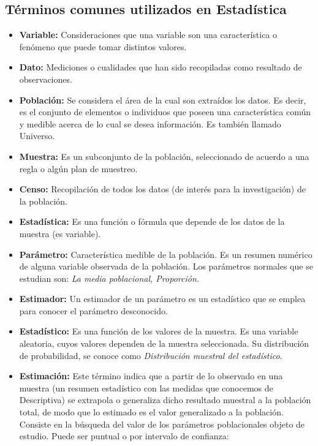 \subsection{T\'erminos comunes utilizados en Estad\'istica}

\begin{itemize}
    \item \textbf{Variable:} Consideraciones que una variable son una caracter\'istica o fen\'omeno que puede tomar distintos valores.
    \item \textbf{Dato:} Mediciones o cualidades que han sido recopiladas como resultado de observaciones.
    \item \textbf{Poblaci\'on:} Se considera el \'area de la cual son extra\'idos los datos. Es decir, es el conjunto de elementos o individuos que poseen una caracter\'istica com\'un y medible acerca de lo cual se desea informaci\'on. Es tambi\'en llamado Universo.
    \item \textbf{Muestra:} Es un subconjunto de la poblaci\'on, seleccionado de acuerdo a una regla o alg\'un plan de muestreo.
    \item \textbf{Censo:} Recopilaci\'on de todos los datos (de inter\'es para la investigaci\'on) de la poblaci\'on.
    \item \textbf{Estad\'istica:} Es una funci\'on o f\'ormula que depende de los datos de la muestra (es variable).
    \item \textbf{Par\'ametro:} Caracter\'istica medible de la poblaci\'on. Es un resumen num\'erico de alguna variable observada de la poblaci\'on. Los par\'ametros normales que se estudian son: \textit{La media poblacional, Proporci\'on.}
    \item \textbf{Estimador:} Un estimador de un par\'ametro es un estad\'istico que se emplea para conocer el par\'ametro desconocido.
    \item \textbf{Estad\'istico:} Es una funci\'on de los valores de la muestra. Es una variable aleatoria, cuyos valores dependen de la muestra seleccionada. Su distribuci\'on de probabilidad, se conoce como \textit{Distribuci\'on muestral del estad\'istico}.
    \item \textbf{Estimaci\'on:} Este t\'ermino indica que a partir de lo observado en una muestra (un resumen estad\'istico con las medidas que conocemos de Descriptiva) se extrapola o generaliza dicho resultado muestral a la poblaci\'on total, de modo que lo estimado es el valor generalizado a la poblaci\'on. Consiste en la b\'usqueda del valor de los par\'ametros poblacionales objeto de estudio. Puede ser puntual o por intervalo de confianza:

\end{itemize}
